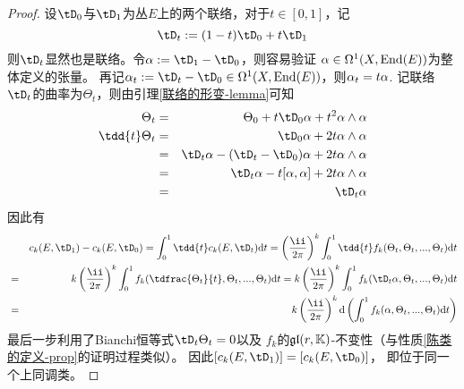 \begin{proof}
设$\tD_0$与$\tD_1$为丛$E$上的两个联络，对于$t\in[0,1]$，记
$$\tD_t:=(1-t)\tD_0+t\tD_1$$
则$\tD_t$显然也是联络。令$\afa:=\tD_1-\tD_0$，则容易验证
$\alpha\in\Omega^1(X,\operatorname{End}(E))$为整体定义的张量。
再记$\afa_t:=\tD_t-\tD_0\in\Omg^1(X,\End(E))$，则$\alpha_t=t\alpha$.
记联络$\tD_t$的曲率为$\Theta_t$，则由引理\ref{联络的形变-lemma}可知
\begin{eqnarray*}
     \Theta_t
&=&
     \Theta_0+t\tD_0\afa+t^2\afa\wedge\afa
\\
     \tdd{t}\Theta_t
&=&
     \tD_0\afa+2t\afa\wedge\afa\\
&=&
     \tD_t\afa-(\tD_t-\tD_0)\afa+2t\afa\wedge\afa\\
&=&
     \tD_t\afa-t[\afa,\afa]+2t\afa\wedge\afa\\
&=&
     \tD_t\afa
\end{eqnarray*}
因此有
\begin{eqnarray*}
& &
     c_k(E,\tD_1)-c_k(E,\tD_0)
 =
     \int_{0}^{1}
       \tdd{t}c_k(E,\tD_t)\td t
 =
     \left(
       \frac{\ii}{2\pi}
     \right)^k
     \int_{0}^{1}
       \tdd{t}f_k(\Theta_t,\Theta_t,...,\Theta_t)
       \td t\\
&=&
     k\left(
       \frac{\ii}{2\pi}
     \right)^k
     \int_{0}^{1}
       f_k(\tdfrac{\Theta_t}{t},\Theta_t,...,\Theta_t)
       \td t
 =
     k\left(
       \frac{\ii}{2\pi}
     \right)^k
     \int_{0}^{1}
       f_k(\tD_t\afa,\Theta_t,...,\Theta_t)
       \td t\\
&=&
     k\left(
       \frac{\ii}{2\pi}
     \right)^k
     \td\left(
       \int_{0}^{1}
         f_k(\afa,\Theta_t,...,\Theta_t)
         \td t
     \right)
\end{eqnarray*}
最后一步利用了Bianchi恒等式$\tD_t\Theta_t=0$以及
$f_k$的$\mathfrak{gl}(r,\mathbb{K})$-不变性（与性质\ref{陈类的定义-prop}的证明过程类似）。
因此$[c_k(E,\tD_1)]=[c_k(E,\tD_0)]$，
即位于同一个上同调类。
\end{proof}


